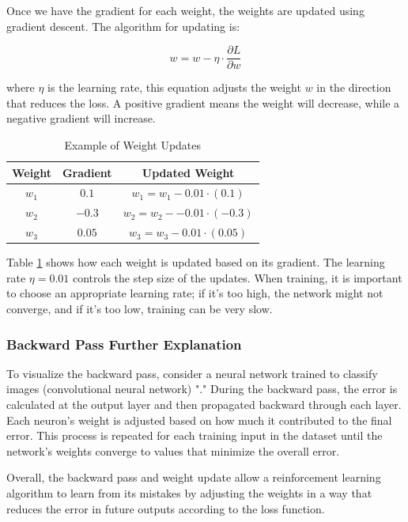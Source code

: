Once we have the gradient for each weight, the weights are updated using gradient descent. The algorithm for updating is:

\[w = w - \eta \cdot \frac{\partial L}{\partial w}\]
 
where $\eta$ is the learning rate, this equation adjusts the weight $w$ in the direction that reduces the loss. A positive gradient means the weight will decrease, while a negative gradient will increase.

\begin{center} \begin{table}[] \centering \begin{tabular}{|c|c|c|} \hline \textbf{Weight} & \textbf{Gradient} & \textbf{Updated Weight} 
\\ \hline $w_1$ & $0.1$ & $w_1 = w_1 - 0.01 \cdot (0.1)$
\\ \hline $w_2$ & $-0.3$ & $w_2 = w_2 - -0.01 \cdot (-0.3)$
\\ \hline $w_3$ & $0.05$ & $w_3 = w_3 - 0.01 \cdot (0.05)$
\\ \hline \end{tabular} \caption{Example of Weight Updates} \label{tab} \end{table} \end{center}

Table \ref{tab} shows how each weight is updated based on its gradient. The learning rate $\eta = 0.01$ controls the step size of the updates. When training, it is important to choose an appropriate learning rate; if it's too high, the network might not converge, and if it's too low, training can be very slow.

\subsubsection*{Backward Pass Further Explanation}

To visualize the backward pass, consider a neural network trained to classify images (convolutional neural network) "\cite{3b1b_1}." During the backward pass, the error is calculated at the output layer and then propagated backward through each layer. Each neuron's weight is adjusted based on how much it contributed to the final error. This process is repeated for each training input in the dataset until the network's weights converge to values that minimize the overall error.

Overall, the backward pass and weight update allow a reinforcement learning algorithm to learn from its mistakes by adjusting the weights in a way that reduces the error in future outputs according to the loss function.

